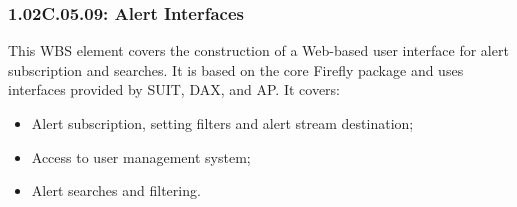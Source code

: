 \subsubsection{1.02C.05.09: Alert Interfaces}
This WBS element covers the construction of a Web-based user interface for alert subscription and searches. It is based on the core Firefly package and uses interfaces provided by SUIT, DAX, and AP. It covers:

\begin{itemize}

\item{Alert subscription, setting filters and alert stream destination;}
\item{Access to user management system;}
\item{Alert searches and filtering.}
\end{itemize}

